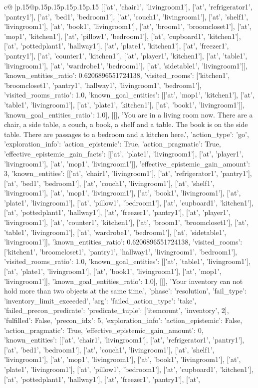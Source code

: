 \documentclass{article}
\begin{document}
{\begin{supertabular}{c@{$\;$}|p{.15\linewidth}@{}p{.15\linewidth}p{.15\linewidth}p{.15\linewidth}p{.15\linewidth}p{.15\linewidth}}
{{{[['at', 'chair1', 'livingroom1'], ['at', 'refrigerator1', 'pantry1'], ['at', 'bed1', 'bedroom1'], ['at', 'couch1', 'livingroom1'], ['at', 'shelf1', 'livingroom1'], ['at', 'book1', 'livingroom1'], ['at', 'broom1', 'broomcloset1'], ['at', 'mop1', 'kitchen1'], ['at', 'pillow1', 'bedroom1'], ['at', 'cupboard1', 'kitchen1'], ['at', 'pottedplant1', 'hallway1'], ['at', 'plate1', 'kitchen1'], ['at', 'freezer1', 'pantry1'], ['at', 'counter1', 'kitchen1'], ['at', 'player1', 'kitchen1'], ['at', 'table1', 'livingroom1'], ['at', 'wardrobe1', 'bedroom1'], ['at', 'sidetable1', 'livingroom1']], 'known_entities_ratio': 0.6206896551724138, 'visited_rooms': ['kitchen1', 'broomcloset1', 'pantry1', 'hallway1', 'livingroom1', 'bedroom1'], 'visited_rooms_ratio': 1.0, 'known_goal_entities': [['at', 'mop1', 'kitchen1'], ['at', 'table1', 'livingroom1'], ['at', 'plate1', 'kitchen1'], ['at', 'book1', 'livingroom1']], 'known_goal_entities_ratio': 1.0}}], [[], 'You are in a living room now. There are a chair, a side table, a couch, a book, a shelf and a table. The book is on the side table. There are passages to a bedroom and a kitchen here.', {'action_type': 'go', 'exploration_info': {'action_epistemic': True, 'action_pragmatic': True, 'effective_epistemic_gain_facts': [['at', 'plate1', 'livingroom1'], ['at', 'player1', 'livingroom1'], ['at', 'mop1', 'livingroom1']], 'effective_epistemic_gain_amount': 3, 'known_entities': [['at', 'chair1', 'livingroom1'], ['at', 'refrigerator1', 'pantry1'], ['at', 'bed1', 'bedroom1'], ['at', 'couch1', 'livingroom1'], ['at', 'shelf1', 'livingroom1'], ['at', 'mop1', 'livingroom1'], ['at', 'book1', 'livingroom1'], ['at', 'plate1', 'livingroom1'], ['at', 'pillow1', 'bedroom1'], ['at', 'cupboard1', 'kitchen1'], ['at', 'pottedplant1', 'hallway1'], ['at', 'freezer1', 'pantry1'], ['at', 'player1', 'livingroom1'], ['at', 'counter1', 'kitchen1'], ['at', 'broom1', 'broomcloset1'], ['at', 'table1', 'livingroom1'], ['at', 'wardrobe1', 'bedroom1'], ['at', 'sidetable1', 'livingroom1']], 'known_entities_ratio': 0.6206896551724138, 'visited_rooms': ['kitchen1', 'broomcloset1', 'pantry1', 'hallway1', 'livingroom1', 'bedroom1'], 'visited_rooms_ratio': 1.0, 'known_goal_entities': [['at', 'table1', 'livingroom1'], ['at', 'plate1', 'livingroom1'], ['at', 'book1', 'livingroom1'], ['at', 'mop1', 'livingroom1']], 'known_goal_entities_ratio': 1.0}}], [[], 'Your inventory can not hold more than two objects at the same time.', {'phase': 'resolution', 'fail_type': 'inventory_limit_exceeded', 'arg': {'failed_action_type': 'take', 'failed_precon_predicate': {'predicate_tuple': ['itemcount', 'inventory', 2], 'fulfilled': False, 'precon_idx': 5}}, 'exploration_info': {'action_epistemic': False, 'action_pragmatic': True, 'effective_epistemic_gain_amount': 0, 'known_entities': [['at', 'chair1', 'livingroom1'], ['at', 'refrigerator1', 'pantry1'], ['at', 'bed1', 'bedroom1'], ['at', 'couch1', 'livingroom1'], ['at', 'shelf1', 'livingroom1'], ['at', 'mop1', 'livingroom1'], ['at', 'book1', 'livingroom1'], ['at', 'plate1', 'livingroom1'], ['at', 'pillow1', 'bedroom1'], ['at', 'cupboard1', 'kitchen1'], ['at', 'pottedplant1', 'hallway1'], ['at', 'freezer1', 'pantry1'], ['at', }}}
\end{supertabular}}
\end{document}
